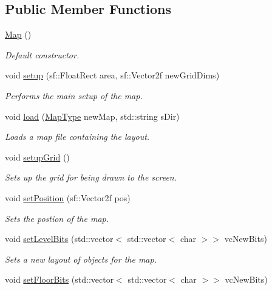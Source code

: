 \subsection*{Public Member Functions}
\begin{DoxyCompactItemize}
\item 
\hyperlink{class_map_a0f5ad0fd4563497b4214038cbca8b582}{Map} ()
\begin{DoxyCompactList}\small\item\em Default constructor. \end{DoxyCompactList}\item 
void \hyperlink{class_map_a8a7a32583dd82811cc7235b70609ab27}{setup} (sf\+::\+Float\+Rect area, sf\+::\+Vector2f new\+Grid\+Dims)
\begin{DoxyCompactList}\small\item\em Performs the main setup of the map. \end{DoxyCompactList}\item 
void \hyperlink{class_map_a80708a0d73fa78f28c41c02ac4ebec14}{load} (\hyperlink{_map_8h_a4c73d8aa04c5b31558f468b95d4748b3}{Map\+Type} new\+Map, std\+::string s\+Dir)
\begin{DoxyCompactList}\small\item\em Loads a map file containing the layout. \end{DoxyCompactList}\item 
void \hyperlink{class_map_ae54d2487832069ead9901a5291faca1d}{setup\+Grid} ()
\begin{DoxyCompactList}\small\item\em Sets up the grid for being drawn to the screen. \end{DoxyCompactList}\item 
void \hyperlink{class_map_a4d063b1781e9e617e6718bbe73b293c6}{set\+Position} (sf\+::\+Vector2f pos)
\begin{DoxyCompactList}\small\item\em Sets the postion of the map. \end{DoxyCompactList}\item 
void \hyperlink{class_map_ac55bea6d3f95b4bf871dc2974b50e234}{set\+Level\+Bits} (std\+::vector$<$ std\+::vector$<$ char $>$$>$ vc\+New\+Bits)
\begin{DoxyCompactList}\small\item\em Sets a new layout of objects for the map. \end{DoxyCompactList}\item 
void \hyperlink{class_map_afd84034728dd3cdd5dcff4d90366ad4e}{set\+Floor\+Bits} (std\+::vector$<$ std\+::vector$<$ char $>$$>$ vc\+New\+Bits)

\end{DoxyCompactItemize}
